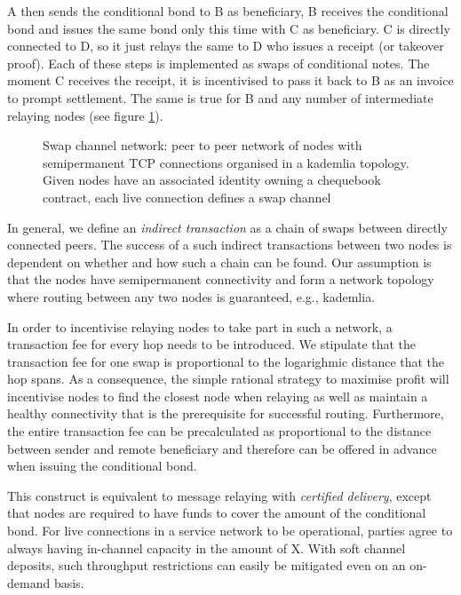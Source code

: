 \documentclass[a4paper,10pt]{article}
\newcommand\gloss[1]{\emph{\gls{#1}}}
\begin{document}
A then sends the conditional bond to B as beneficiary, B receives the conditional bond
and issues the same bond
only this time with C as beneficiary. C is directly connected to D, so
it just relays the same to D who issues a receipt (or takeover proof).
Each of these steps is implemented as swaps of conditional notes. The moment C receives
the receipt, it is incentivised to pass it back to B as an invoice to prompt
settlement. The same is true for B and any number of intermediate relaying nodes
(see figure \ref{fig:swapchannelnetwork}).

\begin{center}
\begin{figure}
\begin{center}
\end{center}
\caption{Swap channel network: peer to peer network of nodes with semipermanent TCP connections organised in
a kademlia topology. Given nodes have an associated identity owning a chequebook contract,
each live connection defines a swap channel}
\label{fig:swapchannelnetwork}
\end{figure}
\end{center}

In general, we define an \emph{indirect transaction} as a chain of swaps between directly connected
peers. The success of a such indirect transactions between two nodes is dependent on whether and
how such a chain can be found. Our assumption is that the nodes have semipermanent connectivity
and form a network topology where routing between any two nodes is guaranteed, e.g., kademlia.

In order to incentivise relaying nodes to take part in such a network,
a transaction fee for every hop needs to be introduced.  We stipulate that the transaction fee
for one swap is proportional to the logarighmic distance that the hop spans.
As a consequence, the simple rational strategy to maximise profit will incentivise nodes to find the
closest node when relaying as well as maintain a healthy connectivity that is the
prerequisite for successful routing.
Furthermore, the entire transaction fee can be precalculated as proportional
to the distance between sender and remote beneficiary and therefore can be offered in advance
when issuing the conditional bond.

This construct is
equivalent to message relaying with \gloss{certified delivery}, except that nodes are required to have
funds to cover the amount of the conditional bond.
For live connections in a service network to be operational,
parties agree to always having in-channel capacity in the amount of X.
With soft channel deposits, such throughput restrictions can easily
be mitigated even on an on-demand basis.
\end{document}
